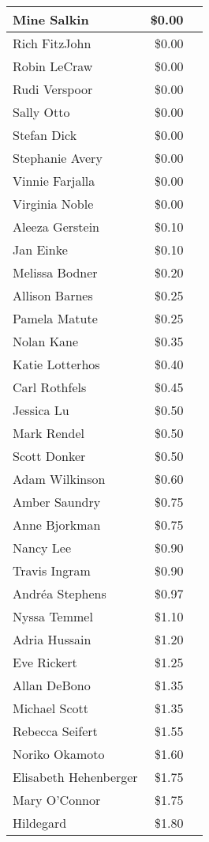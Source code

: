 \begin{longtable}{|l|r|c|}
Mine Salkin & \$0.00 & \\\hline
Rich FitzJohn & \$0.00 & \\\hline
Robin LeCraw & \$0.00 & \\\hline
Rudi Verspoor & \$0.00 & \\\hline
Sally Otto & \$0.00 & \\\hline
Stefan Dick & \$0.00 & \\\hline
Stephanie Avery & \$0.00 & \\\hline
Vinnie Farjalla & \$0.00 & \\\hline
Virginia Noble & \$0.00 & \\\hline
Aleeza Gerstein & \$0.10 & \\\hline
Jan Einke & \$0.10 & \\\hline
Melissa Bodner & \$0.20 & \\\hline
Allison Barnes & \$0.25 & \\\hline
Pamela Matute & \$0.25 & \\\hline
Nolan Kane & \$0.35 & \\\hline
Katie Lotterhos & \$0.40 & \\\hline
Carl Rothfels & \$0.45 & \\\hline
Jessica Lu & \$0.50 & \\\hline
Mark Rendel & \$0.50 & \\\hline
Scott Donker & \$0.50 & \\\hline
Adam Wilkinson & \$0.60 & \\\hline
Amber Saundry & \$0.75 & \\\hline
Anne Bjorkman & \$0.75 & \\\hline
Nancy Lee & \$0.90 & \\\hline
Travis Ingram & \$0.90 & \\\hline
Andr\'ea Stephens & \$0.97 & \\\hline
Nyssa Temmel & \$1.10 & \\\hline
Adria Hussain & \$1.20 & \\\hline
Eve Rickert & \$1.25 & \\\hline
Allan DeBono & \$1.35 & \\\hline
Michael Scott & \$1.35 & \\\hline
Rebecca Seifert & \$1.55 & \\\hline
Noriko Okamoto & \$1.60 & \\\hline
Elisabeth Hehenberger & \$1.75 & \\\hline
Mary O'Connor & \$1.75 & \\\hline
Hildegard & \$1.80 & \\\hline

\end{longtable}
